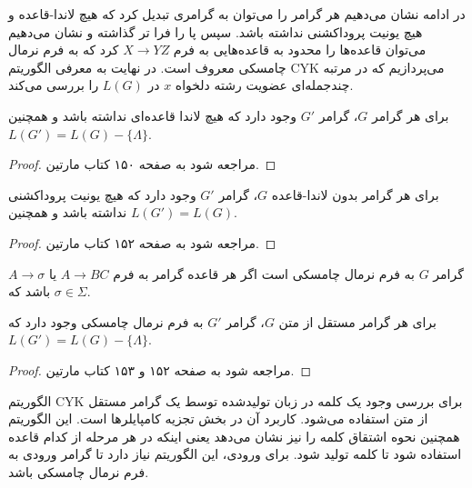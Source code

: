 \documentclass[main.tex]{subfiles}
\begin{document}
	 در ادامه نشان می‌دهیم هر گرامر را می‌توان به گرامری تبدیل کرد که هیچ لاندا-قاعده و هیچ یونیت پروداکشنی نداشته باشد. سپس پا را فرا تر گذاشته و نشان می‌دهیم می‌توان قاعده‌ها را محدود به قاعده‌هایی به فرم 
	 $X \rightarrow YZ$
	 کرد که به فرم نرمال چامسکی
	  معروف است. در نهایت به معرفی الگوریتم CYK 
	 می‌پردازیم که در مرتبه چندجمله‌ای
	  عضویت رشته دلخواه
	 $x$
	 در 
	 $L(G)$
	 را بررسی می‌کند.
	 \begin{theorem}
	 	برای هر گرامر $G$، گرامر $G'$ وجود دارد که هیچ لاندا قاعده‌ای نداشته باشد و همچنین
	 	$L(G') = L(G) - \{\Lambda\}$.
	 \end{theorem}
 	\begin{proof}
 		مراجعه شود به صفحه ۱۵۰ کتاب مارتین.
 	\end{proof}
	  \begin{theorem}
	 	برای هر گرامر بدون لاندا-قاعده $G$، گرامر $G'$ وجود دارد که هیچ یونیت پروداکشنی نداشته باشد و همچنین
	 	$L(G') = L(G)$.
	 \end{theorem}
	 \begin{proof}
	 	مراجعه شود به صفحه ۱۵۲ کتاب مارتین.
	 \end{proof}
 \begin{definition}
 	\label{chomsky}
 	گرامر $G$ به فرم نرمال چامسکی است اگر هر قاعده گرامر به فرم 
 	$A \rightarrow BC$
 	یا 
 	 $A \rightarrow \sigma$
 	 باشد که 
 	 $\sigma \in \Sigma$.
 \end{definition}
	  \begin{theorem}
	برای هر گرامر مستقل از متن $G$، گرامر $G'$ به فرم نرمال چامسکی وجود دارد که 
	$L(G') = L(G) - \{\Lambda\}$.
\end{theorem}
	\begin{proof}
	مراجعه شود به صفحه ۱۵۲ و ۱۵۳ کتاب مارتین.
\end{proof}
	الگوریتم 
	CYK
	برای بررسی وجود یک کلمه در زبان تولیدشده توسط یک گرامر مستقل از متن استفاده می‌شود. کاربرد آن در بخش تجزیه 
	کامپایلرها است. این الگوریتم همچنین نحوه اشتقاق کلمه را نیز نشان می‌دهد یعنی اینکه در هر مرحله از کدام قاعده استفاده شود تا کلمه تولید شود. برای ورودی، این الگوریتم نیاز دارد تا گرامر ورودی به فرم نرمال چامسکی باشد. 
	
\end{document}
